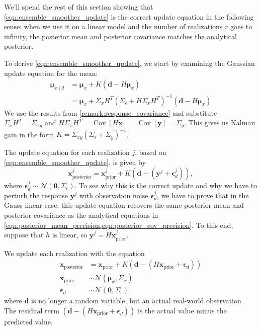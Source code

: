\documentclass[12pt, a4paper]{article}
\theoremstyle{spaced}
\theoremstyle{spaceddef}
\numberwithin{equation}{section}
\begin{document}
We'll spend the rest of this section showing that \cref{eqn:ensemble_smoother_update} is the correct update equation in the following sense: when we use it on a linear model and the number of realizations $r$ goes to infinity, the posterior mean and posterior covariance matches the analytical posterior.

To derive \cref{eqn:ensemble_smoother_update}, we start by examining the Gaussian update equation for the mean:
\begin{align*}
    \bm{\mu}_{x \mid d}
    & = \bm{\mu}_x + K (\bm{d} - H\bm{\mu}_x ) \\
    & = \bm{\mu}_x + \Sigma_x H^T
    \left(
    \Sigma_\epsilon + H \Sigma_x H^T
    \right)^{-1} (\bm{d} - H\bm{\mu}_x )
\end{align*}
We use the results from \cref{remark:response_covariance} and substitute
$\Sigma_x H^T = \Sigma_{xy}$
and
$H \Sigma_x H^T = \operatorname{Cov}\left[ H\bm{x}  \right]
= \operatorname{Cov}\left[ \bm{y}  \right]
= \Sigma_y$.
This gives us Kalman gain in the form $K = \Sigma_{xy}
\left(
\Sigma_\epsilon + \Sigma_y
\right)^{-1}$.

The update equation for each realization $j$, based on \cref{eqn:ensemble_smoother_update}, is given by
\begin{equation*}
    \bm{x}^{j}_{\text{posterior}}
    =
    \bm{x}^{j}_{\text{prior}} + K(\bm{d} - (\bm{y}^j + \bm{\epsilon}_d^j)),
\end{equation*}
where $\bm{\epsilon}_d^j \sim \mathcal{N}(\bm{0}, \Sigma_\epsilon)$.
To see why this is the correct update and why we have to perturb the response $\bm{y}^j$ with observation noise $\bm{\epsilon}_d^j$, we have to prove that in the Gauss-linear case, this update equation recovers the same posterior mean and posterior covariance as the analytical equations in \cref{eqn:posterior_mean_precision,eqn:posterior_cov_precision}.
To this end, suppose that $h$ is linear, so $\bm{y}^j = H \bm{x}^{j}_{\text{prior}}$.

We update each realization with the equation
\begin{align*}
    \bm{x}_{\text{posterior}}
    &=
    \bm{x}_{\text{prior}} + K(\bm{d} - (H \bm{x}_{\text{prior}} + \bm{\epsilon}_d)) \\
    \bm{x}_{\text{prior}} &\sim \mathcal{N}(\bm{\mu}_x, \Sigma_x) \\
    \bm{\epsilon}_d &\sim \mathcal{N}(\bm{0}, \Sigma_\epsilon),
\end{align*}
where $\bm{d}$ is no longer a random variable, but an actual real-world observation.
The residual term $(\bm{d} - (H \bm{x}_{\text{prior}} + \bm{\epsilon}_d))$ is the actual value minus the predicted value.
\end{document}
